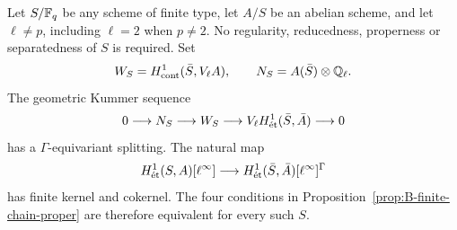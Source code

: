 \begin{theorem}
\label{thm:B-finite-chain-all-bases}
Let \(S/\mathbb F_q\) be any scheme of finite type, let \(A/S\)
be an abelian scheme, and let \(\ell\ne p\), including
\(\ell=2\) when \(p\ne2\).  No regularity, reducedness,
properness or separatedness of \(S\) is required.  Set
\[
 W_S=H^1_{\mathrm{cont}}(\bar S,V_\ell A),\qquad
 N_S=A(\bar S)\otimes\mathbb Q_\ell.
\]
The geometric Kummer sequence
\[
 0\longrightarrow N_S\longrightarrow W_S
 \longrightarrow V_\ell H^1_{\mathrm{\acute et}}(\bar S,\bar A)
 \longrightarrow0
\]
has a \(\Gamma\)-equivariant splitting.  The natural map
\[
 H^1_{\mathrm{\acute et}}(S,A)[\ell^\infty]\longrightarrow
 H^1_{\mathrm{\acute et}}(\bar S,\bar A)[\ell^\infty]^\Gamma
\]
has finite kernel and cokernel.  The four conditions in
Proposition~\ref{prop:B-finite-chain-proper} are therefore
equivalent for every such \(S\).
\end{theorem}
